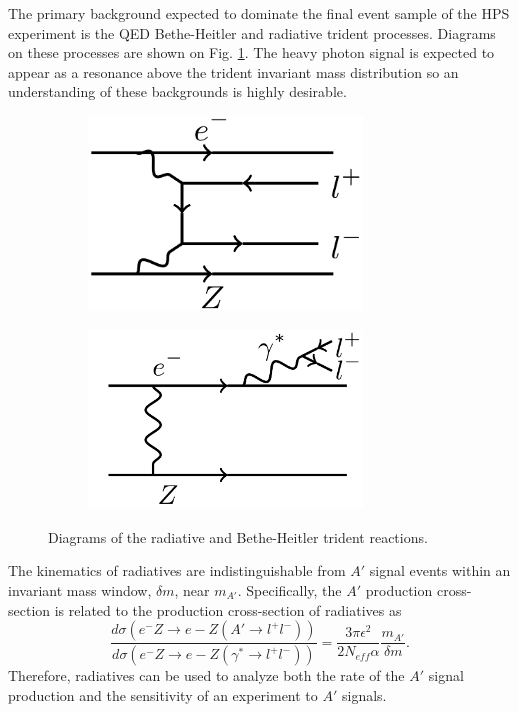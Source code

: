 The primary background expected to dominate the final event sample of the HPS 
experiment is the QED Bethe-Heitler and radiative trident processes.  Diagrams
on these processes are shown on Fig. \ref{fig:tridents}. The heavy photon 
signal is expected to appear as a resonance above the trident invariant mass
distribution so an understanding of these backgrounds is highly desirable. 
\begin{figure}[t]
    \begin{subfigure}{.5\textwidth}
        \centering
        \includegraphics[width=0.8\textwidth]{images/bethe-heitler.png}
    \end{subfigure}
    \begin{subfigure}{.5\textwidth}
        \centering
        \includegraphics[width=0.8\textwidth]{images/radiative.png}
    \end{subfigure}
    \caption{Diagrams of the radiative and Bethe-Heitler trident reactions.}
    \label{fig:tridents}
\end{figure}  

The kinematics of radiatives are indistinguishable from $A'$ signal events 
within an invariant mass window, $\delta m$, near $m_{A'}$. Specifically, 
the $A'$ production cross-section is related to the production cross-section of 
radiatives as 
\begin{equation}
    \frac{d\sigma(e^-Z\rightarrow e-Z(A'\rightarrow l^+l^-))}
    {d\sigma(e^-Z\rightarrow e-Z(\gamma^*\rightarrow l^+l^-))}
    = \frac{3\pi\epsilon^{2}}{2 N_{eff} \alpha} \frac{m_{A'}}{\delta m}.
\end{equation}
Therefore, radiatives can be used to analyze both the rate of the $A'$ signal 
production and the sensitivity of an experiment to $A'$ signals.

